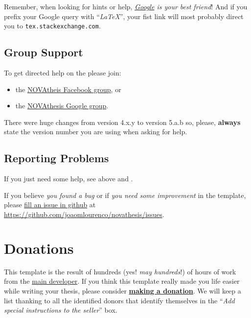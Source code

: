 Remember, when looking for hints or help, \emph{\href{google.com}{Google} is your best friend}!   And if you prefix your Google query with “\emph{LaTeX}”, your fist link will most probably direct you to \texttt{tex.stackexchange.com}.

\subsection{Group Support}
\label{sub:group_support}

To get directed help on the  please join:
\begin{itemize}
  \item the \href{https://www.facebook.com/groups/novathesis}{NOVAtheis Facebook group}, or
  \item the \href{https://groups.google.com/forum/#!forum/novathesis}{NOVAthesis Google group}.
\end{itemize}

There were huge changes from version 4.x.y to version 5.a.b so, please, \textbf{always} state the version number you are using when asking for help.

\subsection{Reporting Problems}
\label{sub:reporting_problems}

If you just need some help, see above  and .

If you believe \emph{you found a bug} or if \emph{you need some improvement} in the template, please \href{https://github.com/joaomlourenco/novathesis/issues}{fill an issue in github} at \url{https://github.com/joaomlourenco/novathesis/issues}.


\section{Donations}
\label{sec:donations}

This template is the result of hundreds (yes! \emph{may hundreds}!) of hours of work from the \href{https://docentes.fct.unl.pt/joao-lourenco}{main developer}.  If you think this template really made you life easier while writing your thesis, please consider \href{https://paypal.me/novathesis}{\textbf{making a donation}}. We will keep a list thanking to all the identified donors that identify themselves in the “\emph{Add special instructions to the seller}” box.

